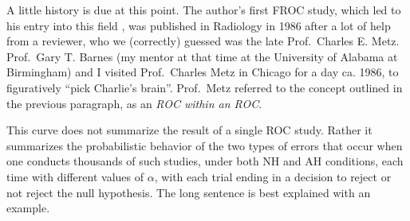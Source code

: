 \documentclass[
]{book}
\begin{document}
A little history is due at this point. The author's first FROC study, which led to his entry into this field \citep{Chakraborty1986DigitalVsConv}, was published in Radiology in 1986 after a lot of help from a reviewer, who we (correctly) guessed was the late Prof.~Charles E. Metz. Prof.~Gary T. Barnes (my mentor at that time at the University of Alabama at Birmingham) and I visited Prof.~Charles Metz in Chicago for a day ca. 1986, to figuratively ``pick Charlie's brain''. Prof.~Metz referred to the concept outlined in the previous paragraph, as an \emph{ROC within an ROC}.

This curve does not summarize the result of a single ROC study. Rather it summarizes the probabilistic behavior of the two types of errors that occur when one conducts thousands of such studies, under both NH and AH conditions, each time with different values of \(\alpha\), with each trial ending in a decision to reject or not reject the null hypothesis. The long sentence is best explained with an example.
\end{document}
